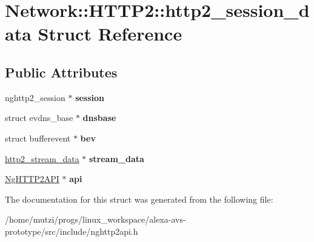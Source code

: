 \hypertarget{structNetwork_1_1HTTP2_1_1http2__session__data}{}\section{Network\+:\+:H\+T\+T\+P2\+:\+:http2\+\_\+session\+\_\+data Struct Reference}
\label{structNetwork_1_1HTTP2_1_1http2__session__data}
\subsection*{Public Attributes}
\begin{DoxyCompactItemize}
\item 
\mbox{\label{structNetwork_1_1HTTP2_1_1http2__session__data_a0bb107f90edb6f13656441011afce5d6}} 
nghttp2\+\_\+session $\ast$ {\bfseries session}
\item 
\mbox{\label{structNetwork_1_1HTTP2_1_1http2__session__data_ae2a28bc34a9277f395a17d859552fc3d}} 
struct evdns\+\_\+base $\ast$ {\bfseries dnsbase}
\item 
\mbox{\label{structNetwork_1_1HTTP2_1_1http2__session__data_ac659794419bb529c6aac3aaa761c8992}} 
struct bufferevent $\ast$ {\bfseries bev}
\item 
\mbox{\label{structNetwork_1_1HTTP2_1_1http2__session__data_a2732413c52f58545465a5b314eed0164}} 
\hyperlink{structNetwork_1_1HTTP2_1_1http2__stream__data}{http2\+\_\+stream\+\_\+data} $\ast$ {\bfseries stream\+\_\+data}
\item 
\mbox{\label{structNetwork_1_1HTTP2_1_1http2__session__data_a4830145cef049e67e3de78f00e409755}} 
\hyperlink{classNetwork_1_1HTTP2_1_1NgHTTP2API}{Ng\+H\+T\+T\+P2\+A\+PI} $\ast$ {\bfseries api}
\end{DoxyCompactItemize}


The documentation for this struct was generated from the following file\+:\begin{DoxyCompactItemize}
\item 
/home/mutzi/progs/linux\+\_\+workspace/alexa-\/avs-\/prototype/src/include/nghttp2api.\+h\end{DoxyCompactItemize}
